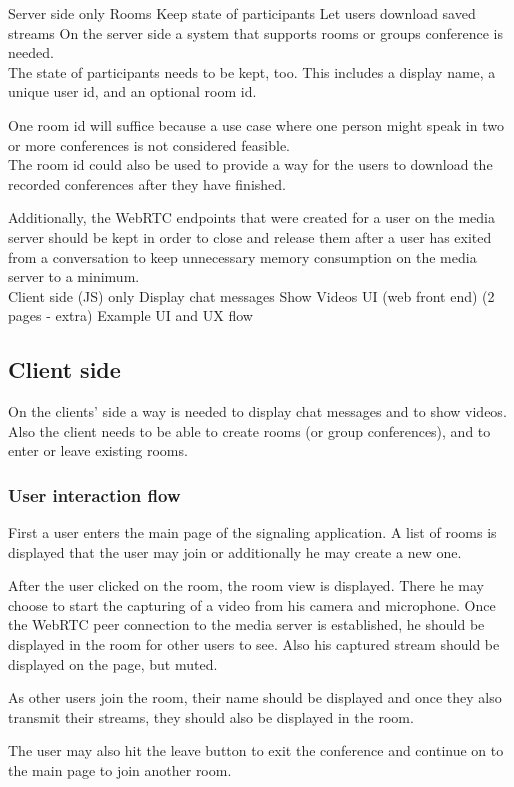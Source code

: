 \documentclass[../../../thesis.tex]{subfiles}
\begin{document}
\comment
Server side only
	Rooms
	Keep state of participants
	Let users download saved streams
\endcomment
On the server side a system that supports rooms or groups conference is needed.\\
The state of participants needs to be kept, too. This includes a display name, a unique user id, and an optional room id.\par
One room id will suffice because a use case where one person might speak in two or more conferences is not considered feasible.\\
The room id could also be used to provide a way for the users to download the recorded conferences after they have finished.\par

Additionally, the WebRTC endpoints that were created for a user on the media server should be kept in order to close and release them after a user has exited from a conversation to keep unnecessary memory consumption on the media server to a minimum.\\

\comment
Client side (JS) only 
	Display chat messages
	Show Videos
UI (web front end) (2 pages - extra)
	Example UI and UX flow
\endcomment
\subsection{Client side}
On the clients' side a way is needed to display chat messages and to show videos.\\
Also the client needs to be able to create rooms (or group conferences), and to enter or leave existing rooms.

\subsubsection{User interaction flow}
First a user enters the main page of the signaling application. A list of rooms is displayed that the user may join or additionally he may create a new one.\par
After the user clicked on the room, the room view is displayed. There he may choose to start the capturing of a video from his camera and microphone. Once the WebRTC peer connection to the media server is established, he should be displayed in the room for other users to see. Also his captured stream should be displayed on the page, but muted.\par
As other users join the room, their name should be displayed and once they also transmit their streams, they should also be displayed in the room.\par
The user may also hit the leave button to exit the conference and continue on to the main page to join another room.
\end{document}
